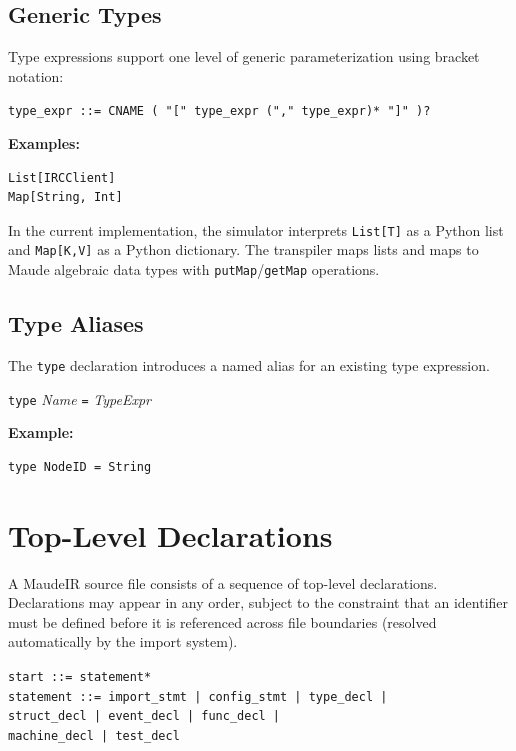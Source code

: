 \documentclass[11pt,letterpaper]{article}
\begin{document}
\subsection{Generic Types}

Type expressions support one level of generic parameterization using
bracket notation:

\begin{syntaxbox}
\texttt{type\_expr ::= CNAME ( "[" type\_expr ("," type\_expr)* "]" )?}
\end{syntaxbox}

\textbf{Examples:}
\begin{lstlisting}[numbers=none]
List[IRCClient]
Map[String, Int]
\end{lstlisting}

In the current implementation, the simulator interprets \texttt{List[T]}
as a Python list and \texttt{Map[K,V]} as a Python dictionary.  The
transpiler maps lists and maps to Maude algebraic data types with
\texttt{putMap}/\texttt{getMap} operations.

\subsection{Type Aliases}

The \lstinline{type} declaration introduces a named alias for an existing
type expression.

\begin{syntaxbox}[type]
\texttt{type} \textit{Name} \texttt{=} \textit{TypeExpr}
\end{syntaxbox}

\textbf{Example:}
\begin{lstlisting}[numbers=none]
type NodeID = String
\end{lstlisting}


\section{Top-Level Declarations}
\label{sec:declarations}

A MaudeIR source file consists of a sequence of top-level declarations.
Declarations may appear in any order, subject to the constraint that
an identifier must be defined before it is referenced across file
boundaries (resolved automatically by the import system).

\begin{syntaxbox}
\texttt{start ::= statement*} \\
\texttt{statement ::= import\_stmt | config\_stmt | type\_decl |} \\
\hspace*{4em}\texttt{struct\_decl | event\_decl | func\_decl |} \\
\hspace*{4em}\texttt{machine\_decl | test\_decl}
\end{syntaxbox}
\end{document}
